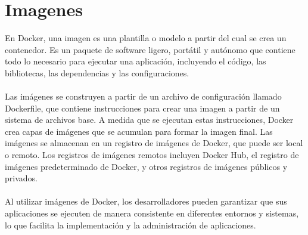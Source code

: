 \documentclass{article}
\begin{document}
\newpage

\section{Imagenes}
En Docker, una imagen es una plantilla o modelo a partir del cual se crea un contenedor. Es un paquete de software ligero, portátil y autónomo que contiene todo lo necesario para ejecutar una aplicación, incluyendo el código, las bibliotecas, las dependencias y las configuraciones.\\
\\
Las imágenes se construyen a partir de un archivo de configuración llamado Dockerfile, que contiene instrucciones para crear una imagen a partir de un sistema de archivos base. A medida que se ejecutan estas instrucciones, Docker crea capas de imágenes que se acumulan para formar la imagen final. Las imágenes se almacenan en un registro de imágenes de Docker, que puede ser local o remoto. Los registros de imágenes remotos incluyen Docker Hub, el registro de imágenes predeterminado de Docker, y otros registros de imágenes públicos y privados.\\
\\
Al utilizar imágenes de Docker, los desarrolladores pueden garantizar que sus aplicaciones se ejecuten de manera consistente en diferentes entornos y sistemas, lo que facilita la implementación y la administración de aplicaciones.\\
\end{document}
